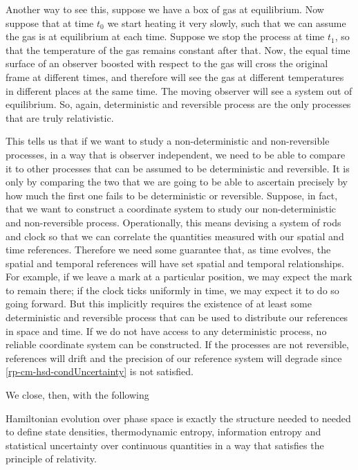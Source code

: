 Another way to see this, suppose we have a box of gas at equilibrium. Now suppose that at time $t_0$ we start heating it very slowly, such that we can assume the gas is at equilibrium at each time. Suppose we stop the process at time $t_1$, so that the temperature of the gas remains constant after that. Now, the equal time surface of an observer boosted with respect to the gas will cross the original frame at different times, and therefore will see the gas at different temperatures in different places at the same time. The moving observer will see a system out of equilibrium. So, again, deterministic and reversible process are the only processes that are truly relativistic.

This tells us that if we want to study a non-deterministic and non-reversible processes, in a way that is observer independent, we need to be able to compare it to other processes that can be assumed to be deterministic and reversible. It is only by comparing the two that we are going to be able to ascertain precisely by how much the first one fails to be deterministic or reversible. Suppose, in fact, that we want to construct a coordinate system to study our non-deterministic and non-reversible process. Operationally, this means devising a system of rods and clock so that we can correlate the quantities measured with our spatial and time references. Therefore we need some guarantee that, as time evolves, the spatial and temporal references will have set spatial and temporal relationships. For example, if we leave a mark at a particular position, we may expect the mark to remain there; if the clock ticks uniformly in time, we may expect it to do so going forward. But this implicitly requires the existence of at least some deterministic and reversible process that can be used to distribute our references in space and time. If we do not have access to any deterministic process, no reliable coordinate system can be constructed. If the processes are not reversible, references will drift and the precision of our reference system will degrade since \ref{rp-cm-hsd-condUncertainty} is not satisfied.

We close, then, with the following
\begin{insight}
	Hamiltonian evolution over phase space is exactly the structure needed to needed to define state densities, thermodynamic entropy, information entropy and statistical uncertainty over continuous quantities in a way that satisfies the principle of relativity.
\end{insight}


